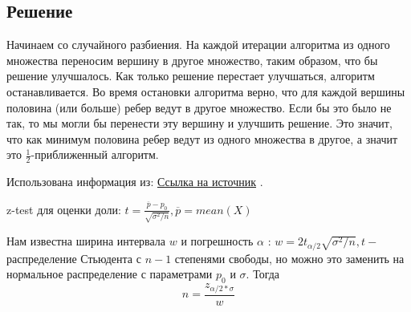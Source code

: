 \documentclass{article}
\begin{document}
\subsection*{Решение} 
Начинаем со случайного разбиения. На каждой итерации алгоритма из одного множества переносим вершину в другое множество, таким образом, что бы решение улучшалось. Как только решение перестает улучшаться, алгоритм останавливается. Во время остановки алгоритма верно, что для каждой вершины половина (или больше) ребер ведут в другое множество. Если бы это было не так, то мы могли бы перенести эту вершину и улучшить решение. Это значит, что как минимум половина ребер ведут из одного множества в другое, а значит это $\frac{1}{2}$-приближенный алгоритм.

Использована информация из: \href{https://ru.wikipedia.org/wiki/Максимальный_разрез_графа#CITEREFMitzenmacher,_Upfal2005}{Ссылка на источник} .

\newpage

z-test для оценки доли: $t = \frac{\overline{p} - p_0}{\sqrt{\sigma^2/n}}, \overline{p} = mean(X)$

Нам известна ширина интервала $w$ и погрешность $\alpha$ : $w = 2t_{\alpha/2}\sqrt{\sigma^2 / n}, t - $ распределение Стьюдента с $n-1$ степенями свободы, но можно это заменить на нормальное распределение с параметрами $p_0$ и $\sigma$.
Тогда $$n = \frac{z_{\alpha/2 * \sigma}}{w}$$
\end{document}
